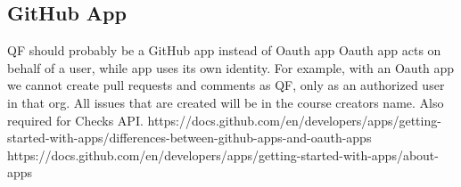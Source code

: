 \subsection{GitHub App}
\label{section:github-app}

QF should probably be a GitHub app instead of Oauth app
Oauth app acts on behalf of a user, while app uses its own identity.
For example, with an Oauth app we cannot create pull requests and comments as QF, only as an authorized user in that org.
All issues that are created will be in the course creators name.
Also required for Checks API.
https://docs.github.com/en/developers/apps/getting-started-with-apps/differences-between-github-apps-and-oauth-apps
https://docs.github.com/en/developers/apps/getting-started-with-apps/about-apps
